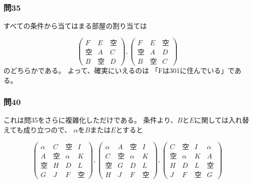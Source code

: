 \documentclass[12pt]{jarticle}
\begin{document}
\subsubsection*{問35}
すべての条件から当てはまる部屋の割り当ては

\[
    \left(
    \begin{array}{ccc}
            F  & E  & 空 \\
            空 & A  & C  \\
            B  & 空 & D
        \end{array}
    \right),
    \left(
    \begin{array}{ccc}
            F  & E  & 空 \\
            空 & A  & D  \\
            B  & 空 & C
        \end{array}
    \right)
\]
のどちらかである。
よって、確実にいえるのは
「Fは301に住んでいる」である。

\clearpage

\subsubsection*{問40}
これは問35をさらに複雑化しただけである。
条件より、$BとE$に関しては入れ替えても成り立つので、
$\alpha$を$B$または$E$とすると

\[
    \left(
    \begin{array}{cccc}
            \alpha & C  & 空     & I  \\
            A      & 空 & \alpha & K  \\
            空     & H  & D      & L  \\
            G      & J  & F      & 空
        \end{array}
    \right),
    \left(
    \begin{array}{cccc}
            \alpha & A  & 空     & I  \\
            C      & 空 & \alpha & K  \\
            空     & G  & D      & L  \\
            H      & J  & F      & 空
        \end{array}
    \right),
    \left(
    \begin{array}{cccc}
            C  & 空     & I  & \alpha \\
            空 & \alpha & K  & A      \\
            H  & D      & L  & 空     \\
            J  & F      & 空 & G
        \end{array}
    \right)
\]
\end{document}
